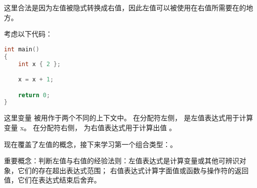 \documentclass[../../LearnCpp.tex]{subfiles}
\begin{document}
这里合法是因为左值被隐式转换成右值，因此左值可以被使用在右值所需要在的地方。

考虑以下代码：

\begin{lstlisting}[language=C++]
int main()
{
    int x { 2 };

    x = x + 1;

    return 0;
}
\end{lstlisting}

这里变量  被用作于两个不同的上下文中。
在分配符左侧， 是左值表达式用于计算变量 x。
在分配符右侧， 为右值表达式用于计算出值 。

现在覆盖了左值的概念，接下来学习第一个组合类型：。

重要概念：判断左值与右值的经验法则：左值表达式是计算变量或其他可辨识对象，它们的存在超出表达式范围；
右值表达式计算字面值或函数与操作符的返回值，它们在表达式结束后舍弃。
\end{document}
